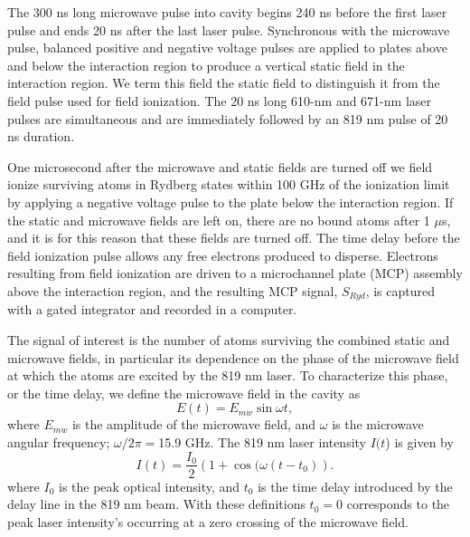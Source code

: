 \documentclass[aps,pra,preprint,groupedaddress]{revtex4-1}
\begin{document}
The 300 ns long microwave pulse into cavity begins 240 ns before the first laser pulse and ends 20 ns after the last laser pulse. Synchronous with the microwave pulse, balanced positive and negative voltage pulses are applied to plates above and below the interaction region to produce a vertical static field in the interaction region. We term this field the static field to distinguish it from the field pulse used for field ionization. The 20 ns long 610-nm and 671-nm laser pulses are simultaneous and are immediately followed by an 819 nm pulse of 20 ns duration.


One microsecond after the microwave and static fields are turned off we field ionize surviving atoms in Rydberg states within 100 GHz of the ionization limit by applying a negative voltage pulse to the plate below the interaction region. If the static and microwave fields are left on, there are no bound atoms after 1 $\mu$s, and it is for this reason that these fields are turned off. The time delay before the field ionization pulse allows any free electrons produced to disperse. Electrons resulting from field ionization are driven to a microchannel plate (MCP) assembly above the interaction region, and the resulting MCP signal, $S_{Ryd}$, is captured with a gated integrator and recorded in a computer.





The signal of interest is the number of atoms surviving the combined static and microwave fields, in particular its dependence on the phase of the microwave field at which the atoms are excited by the 819 nm laser.
To characterize this phase, or the time delay, we define the microwave field in the cavity as
\begin{equation}
E(t) =E_{mw}\sin{\omega t},
\end{equation}
where $E_{mw}$ is the amplitude of the microwave field, and $\omega$ is the microwave angular frequency; $\omega/2\pi=$15.9 GHz. The 819 nm laser intensity $I(t$) is given by
\begin{equation}
I(t) =\frac{I_0}{2}(1+\cos{(\omega (t-t_0)}).
\end{equation}
where $I_0$ is the peak optical intensity, and $t_0$ is the time delay introduced by the delay line in the 819 nm beam. With these definitions $t_0=0$ corresponds to the peak laser intensity's occurring at a zero crossing of the microwave field.
\end{document}
